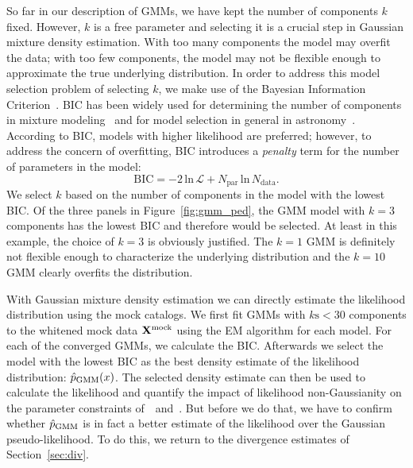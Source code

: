 \documentclass[12pt, letterpaper, preprint]{aastex}
\newcommand{\beq}{\begin{equation}}
\newcommand{\eeq}{\end{equation}}
\newcommand{\Xmock}{{\bf X}^\mathrm{mock}}
\newcommand{\Beut}{\citetalias{beutler2017}}
\newcommand{\Sinh}{\citetalias{sinha2017}}
\begin{document}
So far in our description of GMMs, we have kept
the number of components $k$ fixed. However, $k$ is a free 
parameter and selecting it is a crucial step in Gaussian mixture
density estimation. With too many components the model may overfit 
the data; with too few components, 
the model may not be flexible enough to approximate the true 
underlying distribution. In order to address this model selection problem
of selecting $k$, we make use of the Bayesian Information 
Criterion~\citep[BIC;][]{schwarz1978}. BIC has been widely used for 
determining the number of components in mixture 
modeling~\citep[\emph{e.g.}][]{leroux1992,roeder1997,fraley1998,steele2010performance}
and for model selection in general in 
astronomy~\citep[\emph{e.g.}][]{liddle2007,broderick2011,wilkinson2015,vakili2016}.
According to BIC, models with higher likelihood are preferred; however, 
to address the concern of overfitting, BIC introduces a \emph{penalty} term 
for the number of parameters in the model: 
\beq \label{eq:bic}
\mathrm{BIC} = -2\,\mathrm{ln}\,\mathcal{L} + N_\mathrm{par}\,\mathrm{ln}\,N_\mathrm{data}.
\eeq
We select $k$ based on the number of components in the model with the 
lowest BIC. Of the three panels in Figure~\ref{fig:gmm_ped}, the GMM 
model with $k=3$ components has the lowest BIC and therefore would be 
selected. At least in this example, the choice of $k=3$ is 
obviously justified. The $k = 1$ GMM is definitely not flexible enough 
to characterize the underlying distribution and the $k=10$ GMM clearly
overfits the distribution. 

With Gaussian mixture density estimation we can directly estimate 
the likelihood distribution using the mock catalogs. We first fit 
GMMs with $k\mathrm{s} < 30$ components to the whitened 
mock data $\Xmock$ using the EM algorithm for each model. For each of the 
converged GMMs, we calculate the BIC. Afterwards we select 
the model with the lowest BIC as the best density estimate of the likelihood 
distribution: $\hat{p}_\mathrm{\tiny GMM}(x)$. The selected density estimate can 
then be used to calculate the
likelihood and quantify the impact of likelihood non-Gaussianity on the 
parameter constraints of~\Beut~and~\Sinh. But before we do that, we have to 
confirm whether $\hat{p}_\mathrm{\tiny GMM}$ is in fact a better estimate 
of the likelihood over the Gaussian pseudo-likelihood. To do this, we return 
to the divergence estimates of Section~\ref{sec:div}. 
\end{document}
